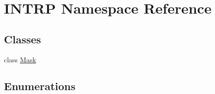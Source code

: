 \hypertarget{namespace_i_n_t_r_p}{}\section{I\+N\+T\+RP Namespace Reference}
\label{namespace_i_n_t_r_p}
\subsection*{Classes}
\begin{DoxyCompactItemize}
\item 
class \hyperlink{class_i_n_t_r_p_1_1_mask}{Mask}
\end{DoxyCompactItemize}
\subsection*{Enumerations}
